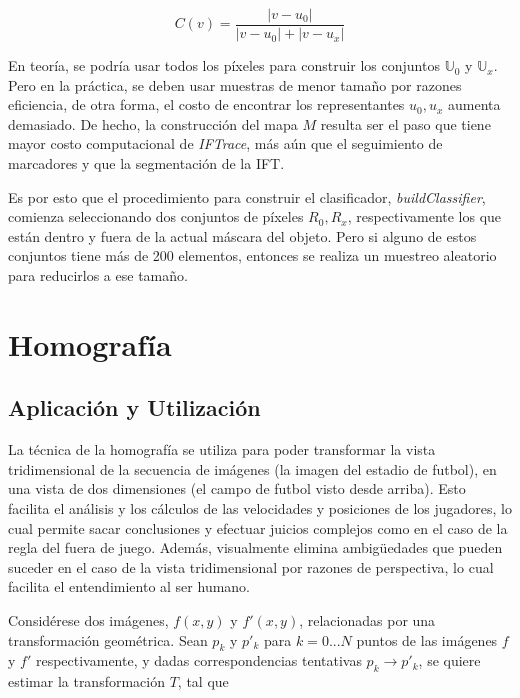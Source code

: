 \begin{equation}
   \label{eq:IFTrace-color-classifier}
   C(v) = \frac{|v - u_{0}|}{|v - u_{0}| + |v - u_{x}|}
\end{equation}

En teoría, se podría usar todos los píxeles para construir los conjuntos
$\mathbb{U}_{0}$ y $\mathbb{U}_{x}$. Pero en la práctica, se deben usar muestras
de menor tamaño por razones eficiencia, de otra forma, el costo de encontrar los
representantes $u_{0},u_{x}$ aumenta demasiado. De hecho, la construcción del mapa
$M$ resulta ser el paso que tiene mayor costo computacional de \textit{IFTrace}, más
aún que el seguimiento de marcadores y que la segmentación de la IFT.

Es por esto que el procedimiento para construir el clasificador,
\textit{buildClassifier}, comienza seleccionando dos conjuntos de píxeles
$R_{0},R_{x}$, respectivamente los que están dentro y fuera de la actual máscara
del objeto. Pero si alguno de estos conjuntos tiene más de 200 elementos,
entonces se realiza un muestreo aleatorio para reducirlos a ese tamaño.

\section{Homografía}

\label{sec:homography}

\subsection{Aplicación y Utilización}

La técnica de la homografía se utiliza para poder transformar la vista
tridimensional de la secuencia de imágenes (la imagen del estadio de futbol), en
una vista de dos dimensiones (el campo de futbol visto desde arriba). Esto
facilita el análisis y los cálculos de las velocidades y posiciones de los
jugadores, lo cual permite sacar conclusiones y efectuar juicios complejos como
en el caso de la regla del fuera de juego. Además, visualmente elimina
ambigüedades que pueden suceder en el caso de la vista tridimensional por
razones de perspectiva, lo cual facilita el entendimiento al ser humano.

Considérese dos imágenes, $f(x,y)$ y $f'(x,y)$, relacionadas por una transformación geométrica. Sean $p_{k}$ y $p'_{k}$ para $k = 0 ... N$ puntos de las imágenes
$f$ y $f'$ respectivamente, y dadas correspondencias tentativas $p_{k} \to p'_{k}$, se quiere estimar la transformación $T$, tal que

